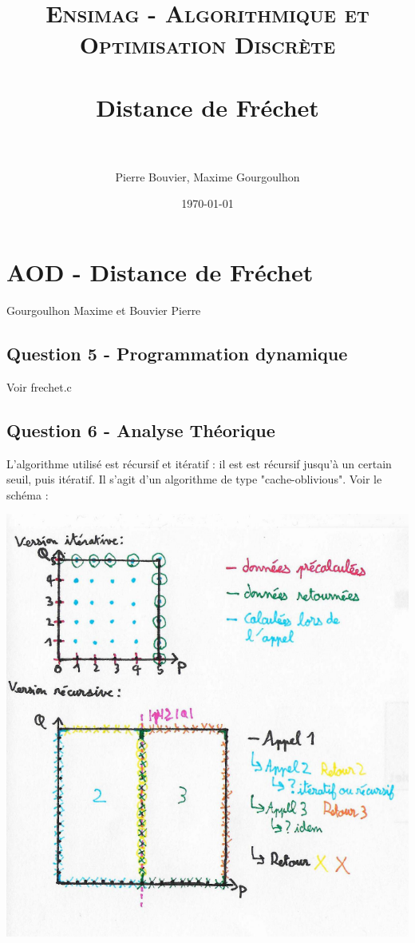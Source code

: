 \documentclass[paper=a4, fontsize=11pt]{scrartcl} %
\title{
\normalfont \normalsize
\textsc{Ensimag - Algorithmique et Optimisation Discrète} \\ [25pt] %
\horrule{0.5pt} \\[0.4cm] %
\huge Distance de Fréchet \\ %
\horrule{2pt} \\[0.5cm] %
}
\author{Pierre Bouvier, Maxime Gourgoulhon} %
\date{\normalsize\today} %
\begin{document}


\section*{AOD - Distance de Fréchet}
Gourgoulhon Maxime et Bouvier Pierre


\subsection*{Question 5 - Programmation dynamique}

Voir frechet.c


\subsection*{Question 6 - Analyse Théorique}

L'algorithme utilisé est récursif et itératif : il est est récursif jusqu'à un certain seuil, puis itératif. Il s'agit d'un algorithme de type "cache-oblivious".
Voir le schéma :

\includegraphics[]{scan.pdf}
\end{document}
